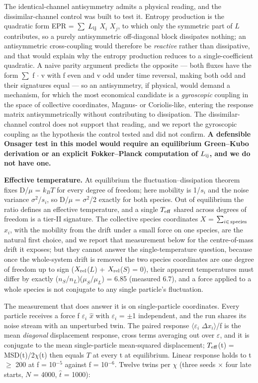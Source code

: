 \documentclass[aps,pre,preprint,superscriptaddress,nofootinbib,longbibliography]{revtex4-2}
\begin{document}
The identical-channel antisymmetry admits a physical reading, and the dissimilar-channel control was built to test it. Entropy production is the quadratic form EPR = $\sum$ $L_{\rm ij}$ $X_{i}$ $X_{j}$, to which only the symmetric part of $L$ contributes, so a purely antisymmetric off-diagonal block dissipates nothing; an antisymmetric cross-coupling would therefore be \emph{reactive} rather than dissipative, and that would explain why the entropy production reduces to a single-coefficient quadratic. A naive parity argument predicts the opposite --- both fluxes have the form $\sum$ f $\cdot$ v with f even and v odd under time reversal, making both odd and their signatures equal --- so an antisymmetry, if physical, would demand a mechanism, for which the most economical candidate is a \emph{gyroscopic} coupling in the space of collective coordinates, Magnus- or Coriolis-like, entering the response matrix antisymmetrically without contributing to dissipation. The dissimilar-channel control does not support that reading, and we report the gyroscopic coupling as the hypothesis the control tested and did not confirm. \textbf{A defensible Onsager test in this model would require an equilibrium Green--Kubo derivation or an explicit Fokker--Planck computation of $L_{\rm ij}$, and we do not have one.}

\textbf{Effective temperature.} At equilibrium the fluctuation--dissipation theorem \cite{r25} fixes D/$\mu$ = $k_BT$ for every degree of freedom; here mobility is 1/$s_{i}$ and the noise variance $\sigma ^{2}$/$s_{i}$, so D/$\mu$ = $\sigma ^{2}$/2 exactly for both species. Out of equilibrium the ratio defines an effective temperature, and a single $T_{\rm eff}$ shared across degrees of freedom is a tier-II signature. The collective species coordinates $X$ = $\sum_{i\in\,{\rm species}}$ $x_{i}$, with the mobility from the drift under a small force on one species, are the natural first choice, and we report that measurement below for the centre-of-mass drift it exposes; but they cannot answer the single-temperature question, because once the whole-system drift is removed the two species coordinates are one degree of freedom up to sign ($X_{\rm rel}$($L$) + $X_{\rm rel}$($S$) = 0), their apparent temperatures must differ by exactly ($n_{S}$/$n_{L}$)($\mu_{S}$/$\mu_{L}$) = 6.85 (measured 6.7), and a force applied to a whole species is not conjugate to any single particle's fluctuation.

The measurement that does answer it is on single-particle coordinates. Every particle receives a force f $\varepsilon_{i}$ $\hat{x}$ with $\varepsilon_{i}$ = $\pm$1 independent, and the run shares its noise stream with an unperturbed twin. The paired response $\langle$$\varepsilon_{i}$ $\Delta$$x_{i}$$\rangle$/f is the mean \emph{diagonal} displacement response, cross terms averaging out over $\varepsilon$, and it is conjugate to the mean single-particle mean-squared displacement; $T_{\rm eff}$(t) = MSD(t)/2$\chi$(t) then equals $T$ at every t at equilibrium. Linear response holds to t $\ge$ 200 at f = 10$^{-5}$ against f = 10$^{-6}$. Twelve twins per $\chi$ (three seeds $\times$ four late starts, $N$ = 4000, $\hat{t}$ = 1000):
\end{document}
